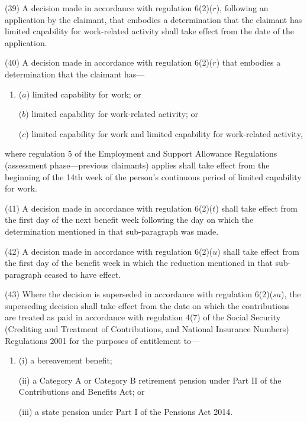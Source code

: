 \documentclass[12pt,a4paper]{article}
\begin{document}
(39) A decision made in accordance with regulation 6(2)($r$), following an application by the claimant, that embodies a determination that the claimant has limited capability for work-related activity shall take effect from the date of the application.

(40) A decision made in accordance with regulation 6(2)($r$) that embodies a determination that the claimant has—
\begin{enumerate}\item[]
($a$) limited capability for work; or

($b$) limited capability for work-related activity; or

($c$) limited capability for work and limited capability for work-related activity,
\end{enumerate}
where regulation 5 of the Employment and Support Allowance Regulations (assessment phase---previous claimants) applies shall take effect from the beginning of the 14th week of the person’s continuous period of limited capability for work.

(41) A decision made in accordance with regulation 6(2)($t$) shall take effect from the first day of the next benefit week following the day on which the determination mentioned in that sub-paragraph was made.

(42) A decision made in accordance with regulation 6(2)($u$) shall take effect from the first day of the benefit week in which the reduction mentioned in that sub-paragraph ceased to have effect.

(43) Where the decision is superseded in accordance with regulation 6(2)($sa$), the superseding decision shall take effect from the date on which the contributions are treated as paid in accordance with regulation 4(7) of the Social Security (Crediting and Treatment of Contributions, and National Insurance Numbers) Regulations 2001 for the purposes of entitlement to—
\begin{enumerate}\item[]
(i) a bereavement benefit;

(ii) a Category A or Category B retirement pension under Part II of the Contributions and Benefits Act; or

(iii) a state pension under Part I of the Pensions Act 2014.
\end{enumerate}
\end{document}
